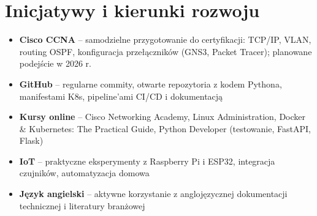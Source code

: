 \documentclass[a4paper,10pt]{article}
\begin{document}
\section{Inicjatywy i kierunki rozwoju}

\small
\begin{itemize}[leftmargin=*, nosep]
  \item \textbf{Cisco CCNA} -- samodzielne przygotowanie do certyfikacji: TCP/IP, VLAN, routing OSPF, konfiguracja przełączników (GNS3, Packet Tracer); planowane podejście w 2026 r.
  \item \textbf{GitHub} -- regularne commity, otwarte repozytoria z kodem Pythona, manifestami K8s, pipeline'ami CI/CD i dokumentacją
  \item \textbf{Kursy online} -- Cisco Networking Academy, Linux Administration, Docker \& Kubernetes: The Practical Guide, Python Developer (testowanie, FastAPI, Flask)
  \item \textbf{IoT} -- praktyczne eksperymenty z Raspberry Pi i ESP32, integracja czujników, automatyzacja domowa
  \item \textbf{Język angielski} -- aktywne korzystanie z anglojęzycznej dokumentacji technicznej i literatury branżowej
\end{itemize}
\end{document}
